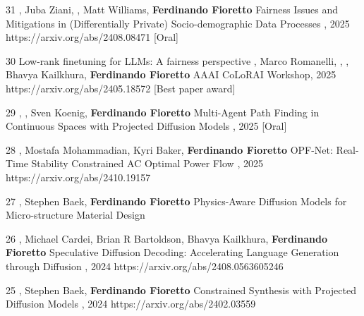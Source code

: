 \begin{pubs}

\wsentryAwd
	{31} 
	{, Juba Ziani, , Matt Williams, {\bf Ferdinando Fioretto}}
	{Fairness Issues and Mitigations in (Differentially Private) Socio-demographic Data Processes}
	{, 2025}
	{https://arxiv.org/abs/2408.08471}
	{[Oral]}%

\wsentryAwd
	{30}
	{Low-rank finetuning for LLMs: A fairness perspective}
	{, Marco Romanelli, , , Bhavya Kailkhura,  {\bf Ferdinando Fioretto}}
	{{\venue AAAI CoLoRAI Workshop}, 2025}
	{https://arxiv.org/abs/2405.18572}
	{[Best paper award]}


\wsentryAwd
	{29} 
	{, , Sven Koenig, {\bf Ferdinando Fioretto}}
	{Multi-Agent Path Finding in Continuous Spaces with Projected Diffusion Models}
	{, 2025}
	{}
	{[Oral]}

\wsentry
	{28}
	{, Mostafa Mohammadian, Kyri Baker, {\bf Ferdinando Fioretto}}
	{OPF-Net: Real-Time Stability Constrained AC Optimal Power Flow}
	{, 2025}
	{https://arxiv.org/abs/2410.19157}

\wsentry
	{27}
	{, Stephen Baek, {\bf Ferdinando Fioretto}}
	{Physics-Aware Diffusion Models for Micro-structure Material Design}
	{}
	{}

\wsentry
	{26}
	{, Michael Cardei, Brian R Bartoldson, Bhavya Kailkhura, {\bf Ferdinando Fioretto}}
	{Speculative Diffusion Decoding: Accelerating Language Generation through Diffusion}
	{, 2024}
	{https://arxiv.org/abs/2408.0563605246}

\wsentry
 	{25}
	{, Stephen Baek, {\bf Ferdinando Fioretto}}
  	{Constrained Synthesis with Projected Diffusion Models}
  	{, 2024}
	{https://arxiv.org/abs/2402.03559}


\end{pubs}
